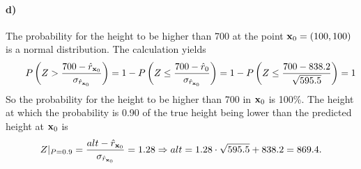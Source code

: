 \paragraph{d)}
The probability for the height to be higher than 700 at the point $\boldsymbol{\mathbf{x}}_0 = (100,100)$ is a normal distribution. The calculation yields 
\begin{equation*}
\begin{array}{cc}
     &  \\
     & 
\end{array}
    P\left(Z>\frac{700 - \hat{r}_{\boldsymbol{\mathbf{x}}_0}}{\sigma_{\hat{r}_{\boldsymbol{\mathbf{x}}_0}}}\right) = 1-P\left(Z\leq\frac{700 - \hat{r}_0}{\sigma_{\hat{r}_{\boldsymbol{\mathbf{x}}_0}}}\right) = 1 - P\left(Z \leq \frac{700-838.2}{\sqrt{595.5}}\right)=1
\end{equation*}
So the probability for the height to be higher than 700 in $\boldsymbol{\mathbf{x}}_0$ is 100\%.
The height at which the probability is 0.90 of the true height being lower than the predicted height at $\boldsymbol{\mathbf{x}}_0$ is
\begin{equation*}
    Z|_{P = 0.9} = \frac{alt - \hat{r}_{\boldsymbol{\mathbf{x}}_0}}{\sigma_{\hat{r}_{\boldsymbol{\mathbf{x}}_0}}} = 1.28 \Rightarrow alt = 1.28\cdot \sqrt{595.5} + 838.2 =  869.4 .
\end{equation*}



